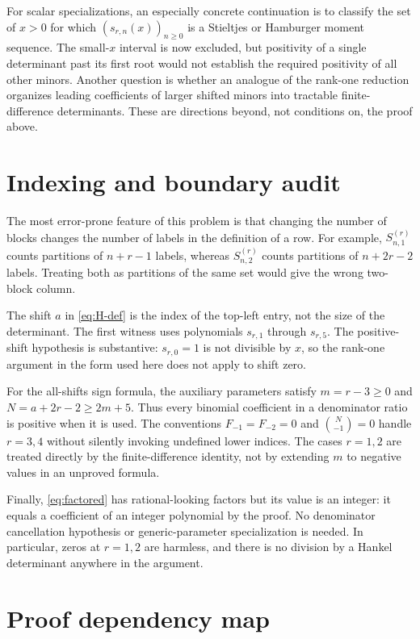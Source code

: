 \documentclass[11pt,a4paper]{article}
\theoremstyle{definition}
\numberwithin{equation}{section}
\begin{document}
For scalar specializations, an especially concrete continuation is to
classify the set of $x>0$ for which $(s_{r,n}(x))_{n\ge0}$ is a
Stieltjes or Hamburger moment sequence. The small-$x$ interval is now
excluded, but positivity of a single determinant past its first root
would not establish the required positivity of all other minors.
Another question is whether an analogue of the rank-one reduction
organizes leading coefficients of larger shifted minors into tractable
finite-difference determinants. These are directions beyond, not
conditions on, the proof above.

\appendix
\section{Indexing and boundary audit}

The most error-prone feature of this problem is that changing the number
of blocks changes the number of labels in the definition of a row.
For example, $S^{(r)}_{n,1}$ counts partitions of $n+r-1$ labels, whereas
$S^{(r)}_{n,2}$ counts partitions of $n+2r-2$ labels. Treating both as
partitions of the same set would give the wrong two-block column.

The shift $a$ in \eqref{eq:H-def} is the index of the top-left entry,
not the size of the determinant. The first witness uses polynomials
$s_{r,1}$ through $s_{r,5}$. The positive-shift hypothesis is substantive:
$s_{r,0}=1$ is not divisible by $x$, so the rank-one argument in the form
used here does not apply to shift zero.

For the all-shifts sign formula, the auxiliary parameters satisfy
$m=r-3\ge0$ and $N=a+2r-2\ge2m+5$. Thus every binomial coefficient in a
denominator ratio is positive when it is used. The conventions
$F_{-1}=F_{-2}=0$ and $\binom N{-1}=0$ handle $r=3,4$ without silently
invoking undefined lower indices. The cases $r=1,2$ are treated directly
by the finite-difference identity, not by extending $m$ to negative
values in an unproved formula.

Finally, \eqref{eq:factored} has rational-looking factors but its value
is an integer: it equals a coefficient of an integer polynomial by the
proof. No denominator cancellation hypothesis or generic-parameter
specialization is needed. In particular, zeros at $r=1,2$ are harmless,
and there is no division by a Hankel determinant anywhere in the
argument.

\section{Proof dependency map}
\end{document}
